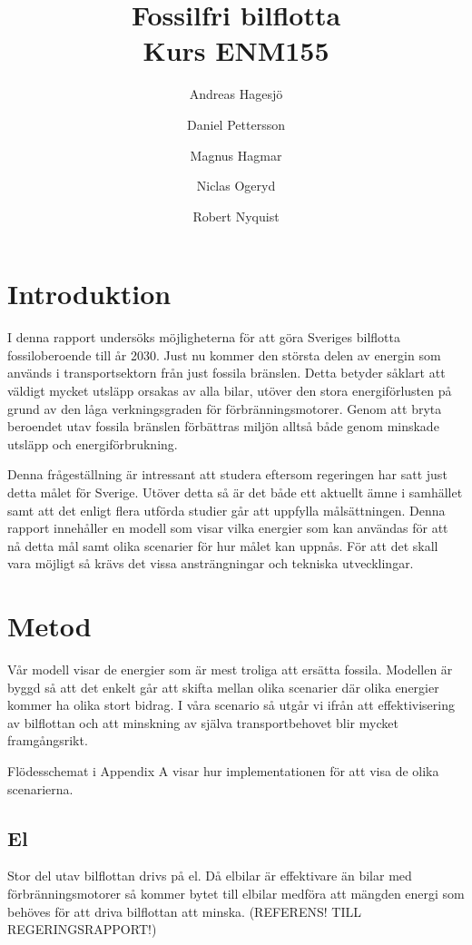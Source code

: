 \documentclass[a4paper,11pt,fleqn, titlepage]{article}
\author{Andreas Hagesjö \and Daniel Pettersson \and
Magnus Hagmar \and Niclas Ogeryd \and Robert Nyquist}
\title{Fossilfri bilflotta \\ Kurs ENM155}
\begin{document}
\maketitle

\section{Introduktion}
I denna rapport undersöks möjligheterna för att göra Sveriges bilflotta fossiloberoende till år 2030. Just nu kommer den största delen av energin som används i transportsektorn från just fossila bränslen. Detta betyder såklart att väldigt mycket utsläpp orsakas av alla bilar, utöver den stora energiförlusten på grund av den låga verkningsgraden för förbränningsmotorer. Genom att bryta beroendet utav fossila bränslen förbättras miljön alltså både genom minskade utsläpp och energiförbrukning.

Denna frågeställning är intressant att studera eftersom regeringen har satt just detta målet för Sverige. Utöver detta så är det både ett aktuellt ämne i samhället samt att det enligt flera utförda studier går att uppfylla målsättningen. Denna rapport innehåller en modell som visar vilka energier som kan användas för att nå detta mål samt olika scenarier för hur målet kan uppnås. För att det skall vara möjligt så krävs det vissa ansträngningar och tekniska utvecklingar. 

\section{Metod}

Vår modell visar de energier som är mest troliga att ersätta fossila. Modellen är byggd så att det enkelt går att skifta mellan olika scenarier där olika energier kommer ha olika stort bidrag.
I våra scenario så utgår vi ifrån att effektivisering av bilflottan och att minskning av själva transportbehovet blir mycket framgångsrikt.


Flödesschemat i Appendix A visar hur implementationen för att visa de olika scenarierna.

\subsection{El}

Stor del utav bilflottan drivs på el. Då elbilar är effektivare än bilar med förbränningsmotorer så kommer bytet till elbilar medföra att mängden energi som behöves för att driva bilflottan att minska. (REFERENS! TILL REGERINGSRAPPORT!)
\end{document}
